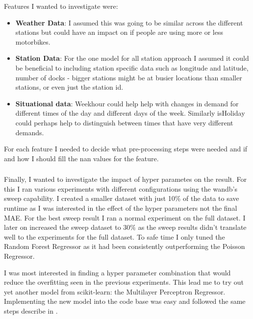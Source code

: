 \documentclass[a4paper]{article}
\begin{document}
    Features I wanted to investigate were:
    \begin{itemize}
        \item \textbf{Weather Data}: I assumed this was going to be similar across the different stations but could have an impact on
        if people are using more or less motorbikes.
        \item \textbf{Station Data}: For the one model for all station approach I assumed it could be beneficial to including station specific data such as longitude
        and latitude, number of docks - bigger stations might be at busier locations than smaller stations, or even just the station id.
        \item \textbf{Situational data}: Weekhour could help help with changes in demand for different times of the day and different days of the week.
        Similarly isHoliday could perhaps help to distinguish between times that have very different demands.
    \end{itemize}

    For each feature I needed to decide what pre-processing steps were needed and if and how I should fill the nan values
    for the feature.

    \subsubsection*{}
    Finally, I wanted to investigate the impact of hyper parametes on the result. For this I
    ran various experiments with different configurations using the wandb's sweep capability.
    I created a smaller dataset with just 10\% of the data to save runtime as I was interested in the effect of the hyper parameters not
    the final MAE. For the best sweep result I ran a normal experiment on the full dataset. I later on increased
    the sweep dataset to 30\% as the sweep results didn't translate well to the experiments for the full dataset.
    To safe time I only tuned the Random Forest Regressor as it had been consistently outperforming the Poisson Regressor.

    I was most interested in finding a hyper parameter combination that would reduce the overfitting seen in the previous
    experiments. This lead me to try out yet another model from scikit-learn: the Multilayer Perceptron Regressor. Implementing
    the new model into the code base was easy and followed the same steps describe in .

    \subsection*{}
\end{document}
